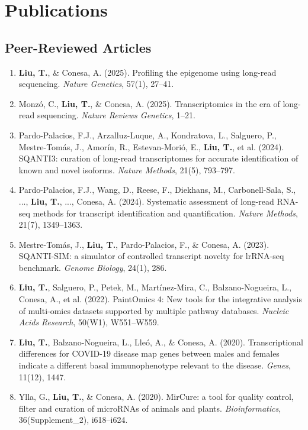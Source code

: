 \documentclass[11pt,a4paper,sans]{moderncv}
\begin{document}
\section{Publications}

\subsection{Peer-Reviewed Articles}

\begin{enumerate}[leftmargin=*,label=\arabic*.]

\item \textbf{Liu, T.}, \& Conesa, A. (2025). Profiling the epigenome using long-read sequencing. \textit{Nature Genetics}, 57(1), 27--41.

\item Monzó, C., \textbf{Liu, T.}, \& Conesa, A. (2025). Transcriptomics in the era of long-read sequencing. \textit{Nature Reviews Genetics}, 1--21.

\item Pardo-Palacios, F.J., Arzalluz-Luque, A., Kondratova, L., Salguero, P., Mestre-Tomás, J., Amorín, R., Estevan-Morió, E., \textbf{Liu, T.}, et al. (2024). SQANTI3: curation of long-read transcriptomes for accurate identification of known and novel isoforms. \textit{Nature Methods}, 21(5), 793--797.

\item Pardo-Palacios, F.J., Wang, D., Reese, F., Diekhans, M., Carbonell-Sala, S., ..., \textbf{Liu, T.}, ..., Conesa, A. (2024). Systematic assessment of long-read RNA-seq methods for transcript identification and quantification. \textit{Nature Methods}, 21(7), 1349--1363.

\item Mestre-Tomás, J., \textbf{Liu, T.}, Pardo-Palacios, F., \& Conesa, A. (2023). SQANTI-SIM: a simulator of controlled transcript novelty for lrRNA-seq benchmark. \textit{Genome Biology}, 24(1), 286.

\item \textbf{Liu, T.}, Salguero, P., Petek, M., Martínez-Mira, C., Balzano-Nogueira, L., Conesa, A., et al. (2022). PaintOmics 4: New tools for the integrative analysis of multi-omics datasets supported by multiple pathway databases. \textit{Nucleic Acids Research}, 50(W1), W551--W559.

\item \textbf{Liu, T.}, Balzano-Nogueira, L., Lleó, A., \& Conesa, A. (2020). Transcriptional differences for COVID-19 disease map genes between males and females indicate a different basal immunophenotype relevant to the disease. \textit{Genes}, 11(12), 1447.

\item Ylla, G., \textbf{Liu, T.}, \& Conesa, A. (2020). MirCure: a tool for quality control, filter and curation of microRNAs of animals and plants. \textit{Bioinformatics}, 36(Supplement\_2), i618--i624.

\end{enumerate}
\end{document}
